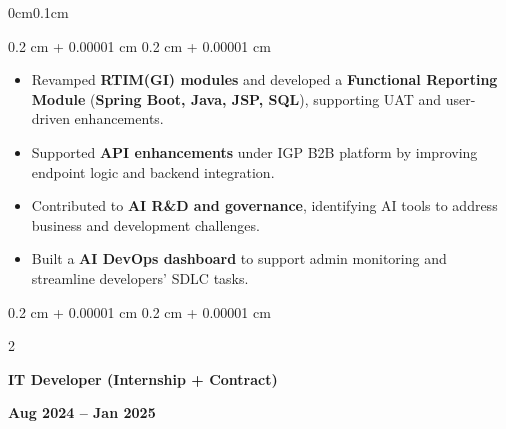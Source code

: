 \documentclass[10pt, letterpaper]{article}
\newenvironment{highlights}{
    \begin{itemize}[
        topsep=0.10 cm,
        parsep=0.10 cm,
        partopsep=0pt,
        itemsep=0pt,
        leftmargin=0.4 cm + 10pt,
        itemsep=0.1cm
    ]
}{
    \end{itemize}
} %
\newenvironment{onecolentry}{
    \begin{adjustwidth}{
        0.2 cm + 0.00001 cm
    }{
        0.2 cm + 0.00001 cm
    }
}{
    \end{adjustwidth}
} %
\newenvironment{twocolentry}[2][]{
    \onecolentry
    \def\secondColumn{#2}
    \setcolumnwidth{\fill, 4.5 cm}
    \begin{paracol}{2}
}{
    \switchcolumn \raggedleft \secondColumn
    \end{paracol}
    \endonecolentry
} %
\begin{document}
        \vspace{0.20 cm}
        \begin{adjustwidth}{0cm}{0.1cm}
            \begin{onecolentry}
                \begin{highlights}
                     \item Revamped \textbf{RTIM(GI) modules} and developed a \textbf{Functional Reporting Module} (\textbf{Spring Boot, Java, JSP, SQL}), supporting UAT and user-driven enhancements.
                    
                    \item Supported \textbf{API enhancements} under IGP B2B platform by improving endpoint logic and backend integration.
    
                    \item Contributed to \textbf{AI R\&D and governance}, identifying AI tools to address business and development challenges.
                    
                    \item Built a \textbf{AI DevOps dashboard} to support admin monitoring and streamline developers’ SDLC tasks.
                    \end{highlights} 
               
            \end{onecolentry}
        \end{adjustwidth}


        \vspace{0.5 cm}

        \begin{twocolentry}{
            \textbf{Aug 2024 – Jan 2025} 
            \text{Kuala Lumpur, MY}
        }
            {\textbf{IT Developer (Internship + Contract)} }  \\
        \end{twocolentry}
\end{document}
